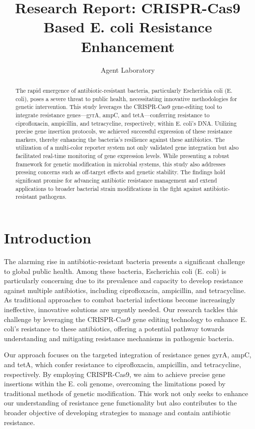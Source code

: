 \documentclass{article}
\title{Research Report: CRISPR-Cas9 Based E. coli Resistance Enhancement}
\author{Agent Laboratory}
\begin{document}
\maketitle

\begin{abstract}
The rapid emergence of antibiotic-resistant bacteria, particularly Escherichia coli (E. coli), poses a severe threat to public health, necessitating innovative methodologies for genetic intervention. This study leverages the CRISPR-Cas9 gene-editing tool to integrate resistance genes—gyrA, ampC, and tetA—conferring resistance to ciprofloxacin, ampicillin, and tetracycline, respectively, within E. coli's DNA. Utilizing precise gene insertion protocols, we achieved successful expression of these resistance markers, thereby enhancing the bacteria's resilience against these antibiotics. The utilization of a multi-color reporter system not only validated gene integration but also facilitated real-time monitoring of gene expression levels. While presenting a robust framework for genetic modification in microbial systems, this study also addresses pressing concerns such as off-target effects and genetic stability. The findings hold significant promise for advancing antibiotic resistance management and extend applications to broader bacterial strain modifications in the fight against antibiotic-resistant pathogens.
\end{abstract}

\section{Introduction}
The alarming rise in antibiotic-resistant bacteria presents a significant challenge to global public health. Among these bacteria, Escherichia coli (E. coli) is particularly concerning due to its prevalence and capacity to develop resistance against multiple antibiotics, including ciprofloxacin, ampicillin, and tetracycline. As traditional approaches to combat bacterial infections become increasingly ineffective, innovative solutions are urgently needed. Our research tackles this challenge by leveraging the CRISPR-Cas9 gene editing technology to enhance E. coli's resistance to these antibiotics, offering a potential pathway towards understanding and mitigating resistance mechanisms in pathogenic bacteria.

Our approach focuses on the targeted integration of resistance genes gyrA, ampC, and tetA, which confer resistance to ciprofloxacin, ampicillin, and tetracycline, respectively. By employing CRISPR-Cas9, we aim to achieve precise gene insertions within the E. coli genome, overcoming the limitations posed by traditional methods of genetic modification. This work not only seeks to enhance our understanding of resistance gene functionality but also contributes to the broader objective of developing strategies to manage and contain antibiotic resistance.
\end{document}
